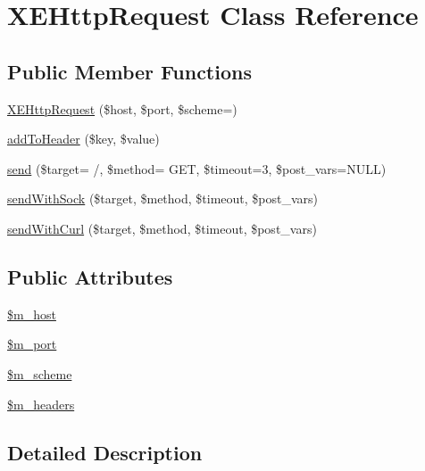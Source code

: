 \hypertarget{classXEHttpRequest}{}\section{X\+E\+Http\+Request Class Reference}
\label{classXEHttpRequest}
\subsection*{Public Member Functions}
\begin{DoxyCompactItemize}
\item 
\hyperlink{classXEHttpRequest_aa8a672ad4e5c3cc8d3b7a9cecc29d349}{X\+E\+Http\+Request} (\$host, \$port, \$scheme=\textquotesingle{}\textquotesingle{})
\item 
\hyperlink{classXEHttpRequest_af936bdc66e6dcabbd8934afc5e210063}{add\+To\+Header} (\$key, \$value)
\item 
\hyperlink{classXEHttpRequest_a8f75aef64b09a7b2d007bdce562eaaf6}{send} (\$target= \textquotesingle{}/\textquotesingle{}, \$method= \textquotesingle{}G\+E\+T\textquotesingle{}, \$timeout=3, \$post\+\_\+vars=N\+U\+L\+L)
\item 
\hyperlink{classXEHttpRequest_a9e316ec4c68dfe9a124327287dae2754}{send\+With\+Sock} (\$target, \$method, \$timeout, \$post\+\_\+vars)
\item 
\hyperlink{classXEHttpRequest_ae6412b6f079b88a67f43602d3cdae2d7}{send\+With\+Curl} (\$target, \$method, \$timeout, \$post\+\_\+vars)
\end{DoxyCompactItemize}
\subsection*{Public Attributes}
\begin{DoxyCompactItemize}
\item 
\hyperlink{classXEHttpRequest_ad88148dced2b42017a96b2a5dd0b533a}{\$m\+\_\+host}
\item 
\hyperlink{classXEHttpRequest_a35c62f61b5ad2c200c53a58dd43a2784}{\$m\+\_\+port}
\item 
\hyperlink{classXEHttpRequest_a501919f00934ef2cc76300fa32c2f19d}{\$m\+\_\+scheme}
\item 
\hyperlink{classXEHttpRequest_a36df236b46af2f09dd9020096dbaed22}{\$m\+\_\+headers}
\end{DoxyCompactItemize}


\subsection{Detailed Description}


